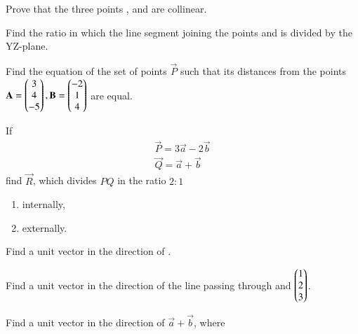 \item Prove that the three points ,  and  are collinear.
%
\\
\solution 
%

%
\item Find the ratio in which the line segment joining the points  and  is divided by the YZ-plane.
%
%
\item Find the equation of the set of points $\vec{P}$ such that its distances from the points
$
\mathbf{A}=\begin{pmatrix}3\\4\\-5\end{pmatrix}, 
\mathbf{B}=\begin{pmatrix}-2\\1\\4\end{pmatrix}
$
are equal. 
%
\item If 
\begin{align}
\vec{P} = 3\vec{a}-2\vec{b}
\\
\vec{Q} = \vec{a}+\vec{b}
\end{align}
%
find $\vec{R}$, which divides $PQ$ in the ratio $2:1$
\begin{enumerate}
\item internally,
\item externally.
\end{enumerate}
%
\item Find a unit vector in the direction of .
%
\item Find a unit vector in the direction of the line passing through  and $\begin{pmatrix}1\\2\\3\end{pmatrix}$.
%
\item Find a unit vector in the direction of $\vec{a}+\vec{b}$, where 
